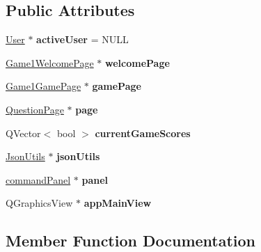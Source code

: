 \subsection*{Public Attributes}
\begin{DoxyCompactItemize}
\item 
\mbox{\label{classGame1View_ac82e9873bf8f94387d5fbc1a3320554c}} 
\hyperlink{classUser}{User} $\ast$ {\bfseries active\+User} = N\+U\+LL
\item 
\mbox{\label{classGame1View_aaa32a67d71d09ead7aa657b5197b7074}} 
\hyperlink{classGame1WelcomePage}{Game1\+Welcome\+Page} $\ast$ {\bfseries welcome\+Page}
\item 
\mbox{\label{classGame1View_a674af281b3cd32678f0196b6ecdc6da3}} 
\hyperlink{classGame1GamePage}{Game1\+Game\+Page} $\ast$ {\bfseries game\+Page}
\item 
\mbox{\label{classGame1View_a15bd450042b3dbe0b4506df138167395}} 
\hyperlink{classQuestionPage}{Question\+Page} $\ast$ {\bfseries page}
\item 
\mbox{\label{classGame1View_ab4c444271424b0468ea2538c94c6c720}} 
Q\+Vector$<$ bool $>$ {\bfseries current\+Game\+Scores}
\item 
\mbox{\label{classGame1View_a7d67e8caaac9295fa0c07b9da043a317}} 
\hyperlink{classJsonUtils}{Json\+Utils} $\ast$ {\bfseries json\+Utils}
\item 
\mbox{\label{classGame1View_a11c488d83ea7edf0c9b0ff9c08c0573a}} 
\hyperlink{classcommandPanel}{command\+Panel} $\ast$ {\bfseries panel}
\item 
\mbox{\label{classGame1View_a0d70035d5b718d7c5a3a016a23e5f38e}} 
Q\+Graphics\+View $\ast$ {\bfseries app\+Main\+View}
\end{DoxyCompactItemize}


\subsection{Member Function Documentation}
\mbox{\label{classGame1View_ad1c25c3de31c9b0181af7e837284b0d5}} 
